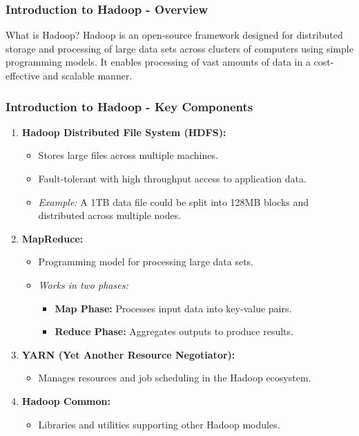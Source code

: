\documentclass[aspectratio=169]{beamer}
\begin{document}
\begin{frame}[fragile]
    \frametitle{Introduction to Hadoop - Overview}
    \begin{block}{What is Hadoop?}
        Hadoop is an open-source framework designed for distributed storage and processing of large data sets across clusters of computers using simple programming models. It enables processing of vast amounts of data in a cost-effective and scalable manner.
    \end{block}
\end{frame}

\begin{frame}[fragile]
    \frametitle{Introduction to Hadoop - Key Components}
    \begin{enumerate}
        \item \textbf{Hadoop Distributed File System (HDFS):}
            \begin{itemize}
                \item Stores large files across multiple machines.
                \item Fault-tolerant with high throughput access to application data.
                \item \textit{Example:} A 1TB data file could be split into 128MB blocks and distributed across multiple nodes.
            \end{itemize}
    
        \item \textbf{MapReduce:}
            \begin{itemize}
                \item Programming model for processing large data sets.
                \item \textit{Works in two phases:}
                    \begin{itemize}
                        \item \textbf{Map Phase:} Processes input data into key-value pairs.
                        \item \textbf{Reduce Phase:} Aggregates outputs to produce results.
                    \end{itemize}
            \end{itemize}
    
        \item \textbf{YARN (Yet Another Resource Negotiator):}
            \begin{itemize}
                \item Manages resources and job scheduling in the Hadoop ecosystem.
            \end{itemize}
    
        \item \textbf{Hadoop Common:}
            \begin{itemize}
                \item Libraries and utilities supporting other Hadoop modules.
            \end{itemize}
    \end{enumerate}
\end{frame}
\end{document}

